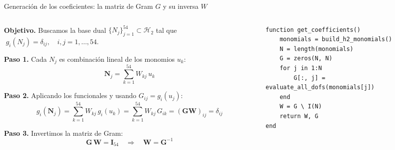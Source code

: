 \documentclass{beamer}
\begin{document}
\begin{frame}[fragile]{Generación de los coeficientes: la matriz de Gram $G$ y su inversa $W$}
  \vspace{-0.20cm}
  \setlength{\abovedisplayskip}{3pt}
  \setlength{\belowdisplayskip}{3pt}
  \setlength{\jot}{1pt}
  \begin{columns}[t]
  \begin{column}{0.42\textwidth}
    \scriptsize
    \textbf{Objetivo.} Buscamos la base dual $\{N_j\}_{j=1}^{54}\subset\mathcal{H}_2$ tal que
    $\;g_i(N_j) = \delta_{ij},\quad i,j=1,\dots,54$.

    \vspace{0.10cm}
    \textbf{Paso 1.} Cada $N_j$ es combinación lineal de los monomios $u_k$:
    \[
      \mathbf{N}_j = \sum_{k=1}^{54} W_{kj}\,u_k
    \]

    \textbf{Paso 2.} Aplicando los funcionales y usando $G_{ij}=g_i(u_j)$:
    \[
      g_i(\mathbf{N}_j) = \sum_{k=1}^{54} W_{kj}\,g_i(u_k)
      = \sum_{k=1}^{54} W_{kj}\,G_{ik}
      = (\mathbf{G}\mathbf{W})_{ij} = \delta_{ij}
    \]

    \textbf{Paso 3.} Invertimos la matriz de Gram:
    \[
      \mathbf{G}\,\mathbf{W} = \mathbf{I}_{54}
      \quad\Longrightarrow\quad
      \mathbf{W} = \mathbf{G}^{-1}
    \]
  \end{column}
  \hfill
  \begin{column}{0.52\textwidth}
    \begin{flushright}
    \begin{lstlisting}[style=codestyle,basicstyle=\ttfamily\fontsize{6}{7}\selectfont]
function get_coefficients()
    monomials = build_h2_monomials()
    N = length(monomials)
    G = zeros(N, N)
    for j in 1:N
        G[:, j] = evaluate_all_dofs(monomials[j])
    end
    W = G \ I(N)
    return W, G
end
    \end{lstlisting}
    \end{flushright}
  \end{column}
  \end{columns}
\end{frame}
\end{document}
